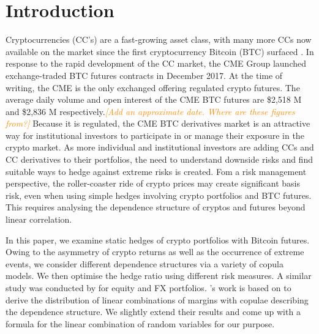 \documentclass[11pt,a4paper,english]{article}
\providecommand{\natp}[1]{\textcolor{darkorange}{#1}}
\begin{document}
\section{Introduction}\label{sec:introduction}
Cryptocurrencies (CC's) are a fast-growing asset class,
with many more CCs now available on the market since the first
cryptocurrency Bitcoin (BTC) surfaced \citep{nakamoto2009}.
In response to the rapid development of the CC market, the CME Group
launched exchange-traded BTC futures contracts in December
2017.
At the time of writing, the CME is the only exchanged offering
regulated crypto futures. 
The average daily volume and open interest of the CME BTC futures are
\$2,518 M and \$2,836 M respectively.\natp{\em [Add an approximate
  date. Where are these figures from?]}
Because it is regulated, the CME BTC derivatives market  
is an attractive way for institutional
investors to participate in or manage their exposure in the crypto
market.
As more individual and institutional investors are adding CCs and CC
derivatives to their portfolios, the need to understand
downside risks and find suitable ways to hedge against extreme risks
is created. 
Fom a risk management perspective, the roller-coaster ride
of crypto prices may create significant basis risk, even when using
simple hedges involving crypto portfolios and BTC futures. This
requires analysing the dependence structure of cryptos and
futures beyond linear correlation. 

In this paper, we examine static hedges of crypto portfolios
with Bitcoin futures. Owing to the asymmetry of crypto returns as
well as the occurrence of extreme events, we consider different 
dependence structures via a variety of copula models. We then optimise
the hedge ratio using different risk measures. A similar study was
conducted by \citep{barbi2014copula} for equity and FX portfolios.
\citet{barbi2014copula}'s work is based on \citet{cherubini2011copula}
to derive the distribution of linear combinations of margins with
copulae describing the dependence structure. We slightly extend their
results and come up with a formula for the linear combination of
random variables for our purpose.
\end{document}
